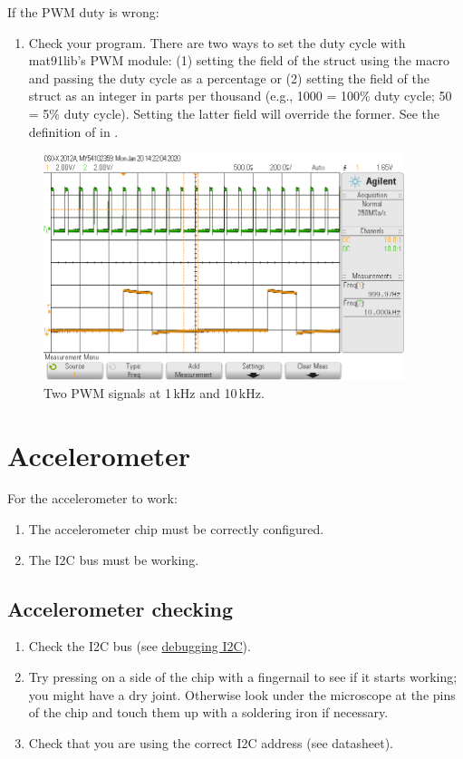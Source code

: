 If the PWM duty is wrong:

\begin{enumerate}
\item
  Check your program. There are two ways to set the duty cycle with
  mat91lib's PWM module: (1) setting the  field of the
   struct using the  macro and
  passing the duty cycle as a percentage or (2) setting the
   field of the  struct as an integer
  in parts per thousand (e.g., 1000 = 100\% duty cycle; 50 = 5\% duty
  cycle). Setting the latter field will override the former. See the
  definition of  in .
\end{enumerate}

\begin{figure}[!h]
\centering
\includegraphics[height=2.60417in]{figs/PWM_2.png}
\caption{Two PWM signals at 1\,kHz and 10\,kHz.}
\end{figure}


\section{Accelerometer}
\label{accelerometer}

For the accelerometer to work:
%
\begin{enumerate}
\item The accelerometer chip must be correctly configured.
\item The I2C bus must be working.
\end{enumerate}


\subsection{Accelerometer checking}
\label{checking-accelerometer}

\begin{enumerate}
\item Check the I2C bus (see \hyperref[debugging-i2c]{debugging I2C}).
\item Try pressing on a side of the chip with a fingernail to see if it
  starts working; you might have a dry joint.  Otherwise look under
  the microscope at the pins of the chip and touch them up with a
  soldering iron if necessary.
\item Check that you are using the correct I2C address (see datasheet).
\end{enumerate}


